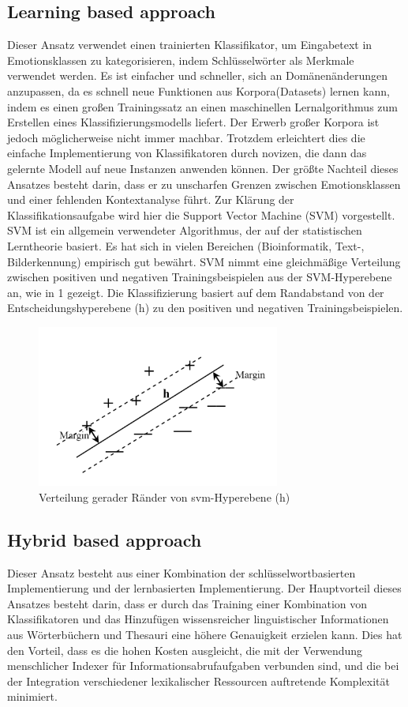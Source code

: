 \documentclass[conference]{IEEEtran}
\begin{document}
\subsection{Learning based approach}
Dieser Ansatz verwendet einen trainierten Klassifikator, um Eingabetext in Emotionsklassen zu kategorisieren, indem Schlüsselwörter als Merkmale verwendet werden. Es ist einfacher und schneller, sich an Domänenänderungen anzupassen, da es schnell neue Funktionen aus Korpora(Datasets) lernen kann, indem es einen großen Trainingssatz an einen maschinellen Lernalgorithmus zum Erstellen
eines Klassifizierungsmodells liefert. Der Erwerb großer Korpora ist jedoch möglicherweise nicht immer machbar. Trotzdem erleichtert dies die einfache Implementierung von Klassifikatoren durch novizen, die dann das gelernte Modell auf neue Instanzen anwenden können. Der größte Nachteil dieses Ansatzes besteht darin, dass er zu unscharfen Grenzen zwischen Emotionsklassen und
einer fehlenden Kontextanalyse führt. Zur Klärung der Klassifikationsaufgabe wird hier die Support Vector Machine (SVM) vorgestellt. SVM ist ein allgemein verwendeter Algorithmus, der auf der statistischen Lerntheorie basiert. Es hat sich in vielen Bereichen (Bioinformatik, Text-,
Bilderkennung) empirisch gut bewährt. SVM nimmt eine gleichmäßige Verteilung zwischen positiven und negativen Trainingsbeispielen aus der SVM-Hyperebene an, wie in 1 gezeigt. Die Klassifizierung basiert auf dem Randabstand von der Entscheidungshyperebene (h) zu den positiven und negativen Trainingsbeispielen.\cite{b2}

\begin{figure}[h]
	\centering
	\includegraphics[width=8cm]{svm}
	\caption{Verteilung gerader Ränder von svm-Hyperebene (h)}
\end{figure}

\newpage
\subsection{Hybrid based approach}
Dieser Ansatz besteht aus einer Kombination der schlüsselwortbasierten Implementierung und der lernbasierten Implementierung. Der Hauptvorteil dieses Ansatzes besteht darin, dass er durch das Training einer Kombination von Klassifikatoren und das Hinzufügen wissensreicher linguistischer Informationen aus Wörterbüchern und Thesauri eine höhere Genauigkeit erzielen kann. Dies hat
den Vorteil, dass es die hohen Kosten ausgleicht, die mit der Verwendung menschlicher Indexer für Informationsabrufaufgaben verbunden sind, und die bei der Integration verschiedener lexikalischer Ressourcen auftretende Komplexität minimiert.\cite{b2}
\end{document}
